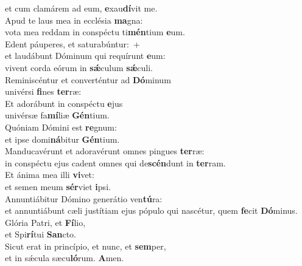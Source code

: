 \evenverse et cum clamárem ad eum, \textbf{e}xau\textbf{dí}vit me.\\
\oddverse Apud te laus mea in ecclésia \textbf{ma}gna:~\*\\
\oddverse vota mea reddam in conspéctu ti\textbf{mén}tium \textbf{e}um.\\
\evenverse Edent páuperes, et saturabúntur:~+\\
\evenverse  et laudábunt Dóminum qui requírunt \textbf{e}um:~\*\\
\evenverse vivent corda eórum in \textbf{sǽ}culum \textbf{sǽ}culi.\\
\oddverse Reminiscéntur et converténtur ad \textbf{Dó}minum~\*\\
\oddverse univérsi \textbf{fi}nes \textbf{ter}ræ:\\
\evenverse Et adorábunt in conspéctu \textbf{e}jus~\*\\
\evenverse univérsæ fa\textbf{mí}liæ \textbf{Gén}tium.\\
\oddverse Quóniam Dómini est \textbf{re}gnum:~\*\\
\oddverse et ipse domi\textbf{ná}bitur \textbf{Gén}tium.\\
\evenverse Manducavérunt et adoravérunt omnes pingues \textbf{ter}ræ:~\*\\
\evenverse in conspéctu ejus cadent omnes qui de\textbf{scén}dunt in \textbf{ter}ram.\\
\oddverse Et ánima mea illi \textbf{vi}vet:~\*\\
\oddverse et semen meum \textbf{sér}viet \textbf{i}psi.\\
\evenverse Annuntiábitur Dómino generátio ven\textbf{tú}ra:~\*\\
\evenverse et annuntiábunt cæli justítiam ejus pópulo qui nascétur, quem \textbf{fe}cit \textbf{Dó}minus.\\
\oddverse Glória Patri, et \textbf{Fí}lio,~\*\\
\oddverse et Spi\textbf{rí}tui \textbf{San}cto.\\
\evenverse Sicut erat in princípio, et nunc, et \textbf{sem}per,~\*\\
\evenverse et in sǽcula sæcu\textbf{ló}rum. \textbf{A}men.\\
